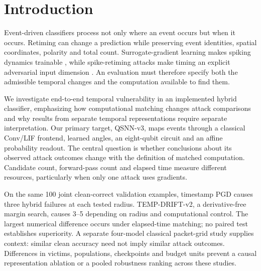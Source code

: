 \section{Introduction}\label{sec:introduction}
Event-driven classifiers process not only where an event occurs but when it occurs. Retiming can change a prediction while preserving event identities, spatial coordinates, polarity and total count. Surrogate-gradient learning makes spiking dynamics trainable \cite{neftci2019}, while spike-retiming attacks make timing an explicit adversarial input dimension \cite{yu2026}. An evaluation must therefore specify both the admissible temporal changes and the computation available to find them.

We investigate end-to-end temporal vulnerability in an implemented hybrid classifier, emphasizing how computational matching changes attack comparisons and why results from separate temporal representations require separate interpretation. Our primary target, QSNN-v3, maps events through a classical Conv/LIF frontend, learned angles, an eight-qubit circuit and an affine probability readout. The central question is whether conclusions about its observed attack outcomes change with the definition of matched computation. Candidate count, forward-pass count and elapsed time measure different resources, particularly when only one attack uses gradients.

On the same 100 joint clean-correct validation examples, timestamp PGD causes three hybrid failures at each tested radius. TEMP-DRIFT-v2, a derivative-free margin search, causes 3--5 depending on radius and computational control. The largest numerical difference occurs under elapsed-time matching; no paired test establishes superiority. A separate four-model classical packet-grid study supplies context: similar clean accuracy need not imply similar attack outcomes. Differences in victims, populations, checkpoints and budget units prevent a causal representation ablation or a pooled robustness ranking across these studies.

